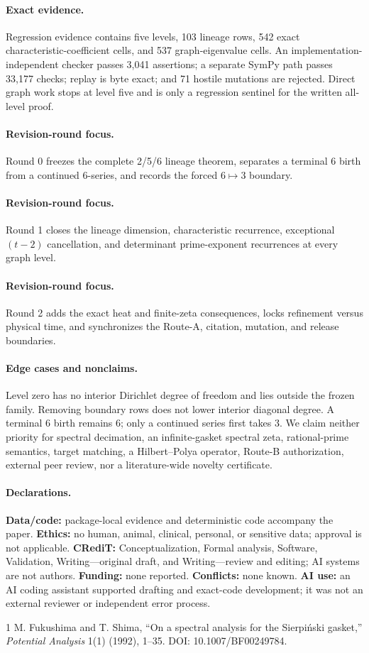 \documentclass[9pt]{extarticle}
\begin{document}
\paragraph{Exact evidence.}
Regression evidence contains five levels, 103 lineage rows, 542 exact
characteristic-coefficient cells, and 537 graph-eigenvalue cells.  An
implementation-independent checker passes 3{,}041 assertions; a separate
SymPy path passes 33{,}177 checks; replay is byte exact; and 71 hostile
mutations are rejected.  Direct graph work stops at level five and is only a
regression sentinel for the written all-level proof.

\ifcase\CRevisionRound
\paragraph{Revision-round focus.} Round 0 freezes the complete 2/5/6
lineage theorem, separates a terminal 6 birth from a continued 6-series, and
records the forced $6\mapsto3$ boundary.
\or
\paragraph{Revision-round focus.} Round 1 closes the lineage dimension,
characteristic recurrence, exceptional $(t-2)$ cancellation, and determinant
prime-exponent recurrences at every graph level.
\or
\paragraph{Revision-round focus.} Round 2 adds the exact heat and finite-zeta
consequences, locks refinement versus physical time, and synchronizes the
Route-A, citation, mutation, and release boundaries.
\fi

\paragraph{Edge cases and nonclaims.}
Level zero has no interior Dirichlet degree of freedom and lies outside the
frozen family.  Removing boundary rows does not lower interior diagonal
degree.  A terminal 6 birth remains 6; only a continued series first takes
3.  We claim neither priority for spectral decimation, an infinite-gasket
spectral zeta, rational-prime semantics, target matching, a Hilbert--Polya
operator, Route-B authorization, external peer review, nor a
literature-wide novelty certificate.

\paragraph{Declarations.}
\textbf{Data/code:} package-local evidence and deterministic code accompany
the paper.  \textbf{Ethics:} no human, animal, clinical, personal, or
sensitive data; approval is not applicable.  \textbf{CRediT:}
Conceptualization, Formal analysis, Software, Validation, Writing---original
draft, and Writing---review and editing; AI systems are not authors.
\textbf{Funding:} none reported.  \textbf{Conflicts:} none known.
\textbf{AI use:} an AI coding assistant supported drafting and exact-code
development; it was not an external reviewer or independent error process.

\begin{thebibliography}{1}
 M. Fukushima and T. Shima,
``On a spectral analysis for the Sierpiński gasket,''
\emph{Potential Analysis} 1(1) (1992), 1--35.
DOI: 10.1007/BF00249784.
\end{thebibliography}
\end{document}
